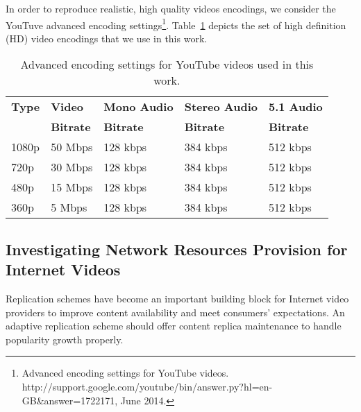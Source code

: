 In order to reproduce realistic, high quality videos encodings, we consider the YouTuve advanced encoding settings\footnote{Advanced encoding settings for YouTube videos. http://support.google.com/youtube/bin/answer.py?hl=en-GB\&answer=1722171, June 2014.}. Table~\ref{tab:youtube_encodings} depicts the set of high definition (HD) video encodings that we use in this work. 

\begin{table}
  \label{tab:motivation_advanced_encodings}
	\begin{center}
		\caption{Advanced encoding settings for YouTube videos used in this work.}
  		\label{tab:youtube_encodings}
		\begin{tabular}{p{1.1cm}||p{1.7cm} p{2.5cm} p{2.5cm} p{2cm}}
			{\bf Type}&{\bf Video}&{\bf Mono Audio}&{\bf Stereo Audio}&{\bf 5.1 Audio}\\
			&{\bf Bitrate}&{\bf Bitrate}&{\bf Bitrate}&{\bf Bitrate}\\
			\hline
			\hline
			1080p&50 Mbps&128 kbps&384 kbps&512 kbps\\
			720p&30 Mbps&128 kbps&384 kbps&512 kbps\\
			480p&15 Mbps&128 kbps&384 kbps&512 kbps\\
			360p&5 Mbps&128 kbps&384 kbps&512 kbps\\
		\end{tabular}
	\end{center}
\end{table}

\subsection{Investigating Network Resources Provision for Internet Videos}



Replication schemes have become an important building block for Internet video providers to improve content availability and meet consumers' expectations. 
An adaptive replication scheme should offer content replica maintenance to handle popularity growth properly.

